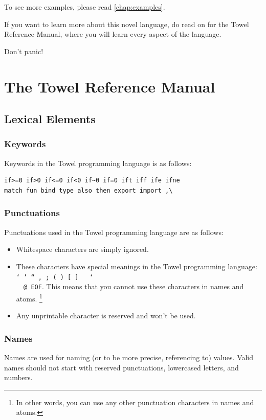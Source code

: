 \documentclass{report}
\begin{document}
To see more examples, please read \autoref{chap:examples}.

If you want to learn more about this novel language, do read on for the Towel Reference Manual, where you will learn every aspect of the language.

Don't panic!

\part{The Towel Reference Manual}

\chapter{Lexical Elements}\label{chap:grammar}
\section{Keywords}

Keywords in the Towel programming language is as follows:
\begin{verbatim}
if>=0 if>0 if<=0 if<0 if~0 if=0 ift iff ife ifne
match fun bind type also then export import ,\
\end{verbatim}

\section{Punctuations}

Punctuations used in the Towel programming language are as follows:

\begin{itemize}
\item Whitespace characters are simply ignored.
\item These characters have special meanings in the Towel programming language: \texttt{` ' `` , ; ( ) [ ] { } \char`\\ ~  @ EOF}. This means that you cannot use these characters in names and atoms. \footnote{In other words, you can use any other punctuation characters in names and atoms.}
\item Any unprintable character is reserved and won't be used.
\end{itemize}

\section{Names}\label{sec:def-name}

Names are used for naming (or to be more precise, referencing to) values. Valid names should not start with reserved punctuations, lowercased letters, and numbers.
\end{document}
